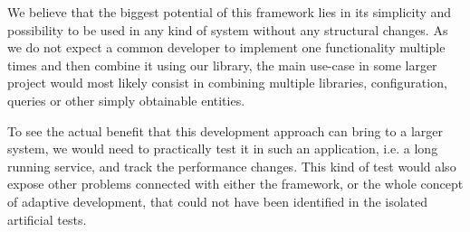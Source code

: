 We believe that the biggest potential of this framework lies in its simplicity and possibility to be used in any kind of system without any structural changes. As we do not expect a common developer to implement one functionality multiple times and then combine it using our library, the main use-case in some larger project would most likely consist in combining multiple libraries, configuration, queries or other simply obtainable entities.

To see the actual benefit that this development approach can bring to a larger system, we would need to practically test it in such an application, i.e. a long running service, and track the performance changes. This kind of test would also expose other problems connected with either the framework, or the whole concept of adaptive development, that could not have been identified in the isolated artificial tests.